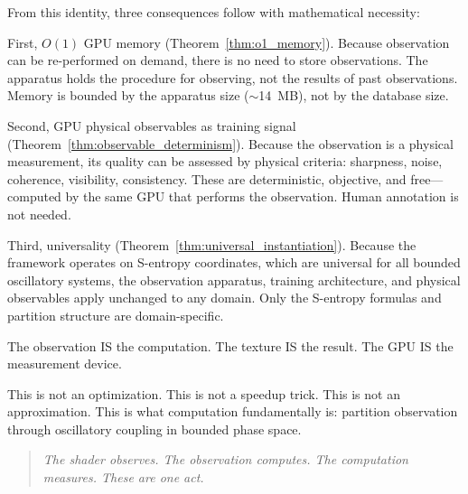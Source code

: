 \documentclass[11pt,twocolumn,a4paper]{article}
\theoremstyle{definition}
\theoremstyle{remark}
\begin{document}
From this identity, three consequences follow with mathematical necessity:

First, $O(1)$ GPU memory (Theorem~\ref{thm:o1_memory}). Because observation can be re-performed on demand, there is no need to store observations. The apparatus holds the procedure for observing, not the results of past observations. Memory is bounded by the apparatus size ($\sim$14~MB), not by the database size.

Second, GPU physical observables as training signal (Theorem~\ref{thm:observable_determinism}). Because the observation is a physical measurement, its quality can be assessed by physical criteria: sharpness, noise, coherence, visibility, consistency. These are deterministic, objective, and free---computed by the same GPU that performs the observation. Human annotation is not needed.

Third, universality (Theorem~\ref{thm:universal_instantiation}). Because the framework operates on S-entropy coordinates, which are universal for all bounded oscillatory systems, the observation apparatus, training architecture, and physical observables apply unchanged to any domain. Only the S-entropy formulas and partition structure are domain-specific.

The observation IS the computation. The texture IS the result. The GPU IS the measurement device.

This is not an optimization. This is not a speedup trick. This is not an approximation. This is what computation fundamentally is: partition observation through oscillatory coupling in bounded phase space.

\begin{quote}
\emph{The shader observes. The observation computes. The computation measures. These are one act.}
\end{quote}





\end{document}
